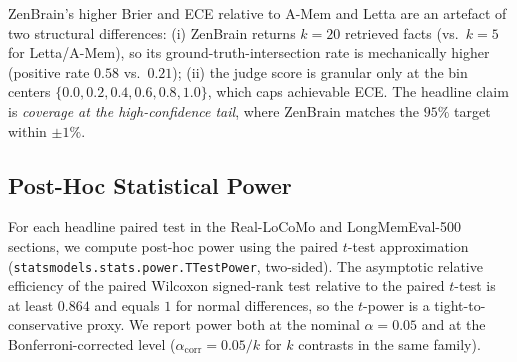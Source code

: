 \documentclass{article}
\begin{document}
ZenBrain's higher Brier and ECE relative to A-Mem and Letta are an artefact of
two structural differences: (i) ZenBrain returns $k{=}20$ retrieved facts
(vs.\ $k{=}5$ for Letta/A-Mem), so its ground-truth-intersection rate is
mechanically higher (positive rate $0.58$ vs.\ $0.21$); (ii) the judge score
is granular only at the bin centers $\{0.0, 0.2, 0.4, 0.6, 0.8, 1.0\}$, which
caps achievable ECE. The headline claim is \emph{coverage at the
high-confidence tail}, where ZenBrain matches the $95\%$ target within
$\pm 1\%$.

\subsection{Post-Hoc Statistical Power}
\label{app:power-analysis}

For each headline paired test in the Real-LoCoMo and LongMemEval-500
sections, we compute post-hoc power using the paired $t$-test
approximation (\texttt{statsmodels.stats.power.TTestPower}, two-sided).
The asymptotic relative efficiency of the paired Wilcoxon signed-rank
test relative to the paired $t$-test is at least $0.864$
\citep{hodges1956are} and equals $1$ for normal differences, so the
$t$-power is a tight-to-conservative proxy. We report power both at the
nominal $\alpha{=}0.05$ and at the Bonferroni-corrected level
($\alpha_{\text{corr}}{=}0.05/k$ for $k$ contrasts in the same family).
\end{document}
